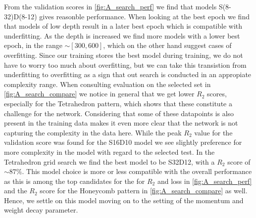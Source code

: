 From the validation scores in \cref{fig:A_search_perf} we find that models
S(8-32)D(8-12) gives reasonble performance. When looking at the best epoch we
find that  models of low depth result in a later best epoch which is compatible
with underfitting. As the depth is increased we find more models with a lower
best epoch, in the range $\sim [300, 600]$, which on the other hand suggest
cases of overfitting. Since our training stores the best model during training,
we do not have to worry too much about overfitting, but we can take this
transistion from underfitting to overfitting as a sign that out search is
conducted in an appropiate complexity range. When consulting evaluation on the
selected set in \cref{fig:A_search_compare} we notice in general that we get
lower $R_2$ scores, especially for the Tetrahedron pattern, which shows that these constitute a challenge for the network. Considering that some of these datapoints is also present in the training data makes it even more clear that the network is not capturing the complexity in the data here. While the peak $R_2$ value for the validation score was found for the S16D10 model we see slightly preference for more complexity in the model with regard to the selected test. In the Tetrahedron grid search we find the best model to be S32D12, with a $R_2$ score of $\sim 87 \%$. This model choice is more or less compatible with the overall performance as this is among the top candidates for the for $R_2$ and loss in \cref{fig:A_search_perf} and the $R_2$ score for the Honeycomb pattern in \cref{fig:A_search_compare} as well. Hence, we settle on this model moving on to the setting of the momentum and weight decay parameter. 

